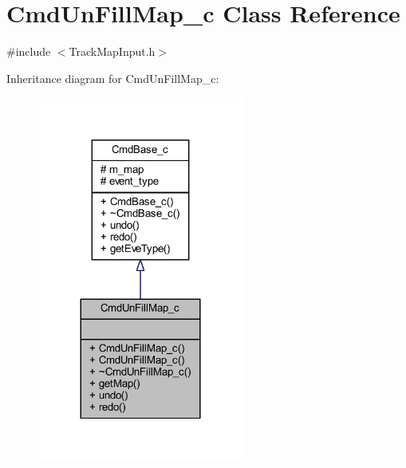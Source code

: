 \hypertarget{class_cmd_un_fill_map__c}{\section{Cmd\+Un\+Fill\+Map\+\_\+c Class Reference}
\label{class_cmd_un_fill_map__c}
}


{\ttfamily \#include $<$Track\+Map\+Input.\+h$>$}



Inheritance diagram for Cmd\+Un\+Fill\+Map\+\_\+c\+:\nopagebreak
\begin{figure}[H]
\begin{center}
\leavevmode
\includegraphics[width=192pt]{class_cmd_un_fill_map__c__inherit__graph}
\end{center}
\end{figure}


